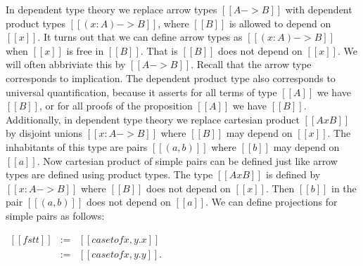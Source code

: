 In dependent type theory we replace arrow types $[[A -> B]]$ with
dependent product types $[[(x : A) -> B]]$, where $[[B]]$ is allowed to
depend on $[[x]]$.  It turns out that we can define arrow types as
$[[(x : A) -> B]]$ when $[[x]]$ is free in $[[B]]$.  That is $[[B]]$
does not depend on $[[x]]$.  We will often abbriviate this by $[[A ->
    B]]$.  Recall that the arrow type corresponds to implication.  The
dependent product type also corresponds to universal quantification,
because it asserts for all terms of type $[[A]]$ we have $[[B]]$, or
for all proofs of the proposition $[[A]]$ we have $[[B]]$.
Additionally, in dependent type theory we replace cartesian product
$[[A x B]]$ by disjoint unions $[[{x : A} -> B]]$ where $[[B]]$ may
depend on $[[x]]$.  The inhabitants of this type are pairs $[[(a,b)]]$
where $[[b]]$ may depend on $[[a]]$.  Now cartesian product of simple
pairs can be defined just like arrow types are defined using product
types.  The type $[[A x B]]$ is defined by $[[{x : A} -> B]]$ where
$[[B]]$ does not depend on $[[x]]$.  Then $[[b]]$ in the pair
$[[(a,b)]]$ does not depend on $[[a]]$.  We can define projections for
simple pairs as follows:
\begin{center}
  \begin{math}
    \begin{array}{lll}
      [[fst t]] & := & [[case t of x,y.x]]\\
      [[snd t]] & := & [[case t of x,y.y]].
    \end{array}
  \end{math}
\end{center}

